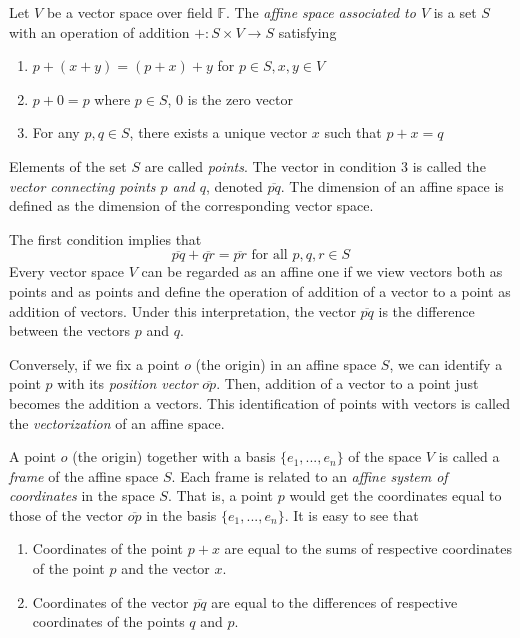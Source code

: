 \documentclass{article}
\begin{document}
    \begin{definition}
    Let $V$ be a vector space over field $\mathbb{F}$. The \textit{affine space associated to $V$} is a set $S$ with an operation of addition $+: S \times V \longrightarrow S$ satisfying 
    \begin{enumerate}
        \item $p + (x + y) = (p + x) + y$ for $p \in S, x, y \in V$
        \item $p + 0 = p$ where $p \in S$, $0$ is the zero vector 
        \item For any $p, q \in S$, there exists a unique vector $x$ such that $p + x = q$
    \end{enumerate}
    Elements of the set $S$ are called \textit{points}. The vector in condition 3 is called the \textit{vector connecting points $p$ and $q$}, denoted $\overline{pq}$. The dimension of an affine space is defined as the dimension of the corresponding vector space. 
    \end{definition}

    The first condition implies that
    \[\overline{pq} + \overline{qr} = \overline{pr} \text{ for all } p, q, r \in S\]
    Every vector space $V$ can be regarded as an affine one if we view vectors both as points and as points and define the operation of addition of a vector to a point as addition of vectors. Under this interpretation, the vector $\overline{pq}$ is the difference between the vectors $p$ and $q$. 

    \begin{definition}
    Conversely, if we fix a point $o$ (the origin) in an affine space $S$, we can identify a point $p$ with its \textit{position vector} $\overline{op}$. Then, addition of a vector to a point just becomes the addition a vectors. This identification of points with vectors is called the \textit{vectorization} of an affine space. 
    \end{definition}

    \begin{definition}
    A point $o$ (the origin) together with a basis $\{e_1, ..., e_n\}$ of the space $V$ is called a \textit{frame} of the affine space $S$. Each frame is related to an \textit{affine system of coordinates} in the space $S$. That is, a point $p$ would get the coordinates equal to those of the vector $\overline{op}$ in the basis $\{e_1, ..., e_n\}$. It is easy to see that 
    \begin{enumerate}
        \item Coordinates of the point $p+x$ are equal to the sums of respective coordinates of the point $p$ and the vector $x$. 
        \item Coordinates of the vector $\overline{pq}$ are equal to the differences of respective coordinates of the points $q$ and $p$. 
    \end{enumerate}
    \end{definition}
\end{document}
